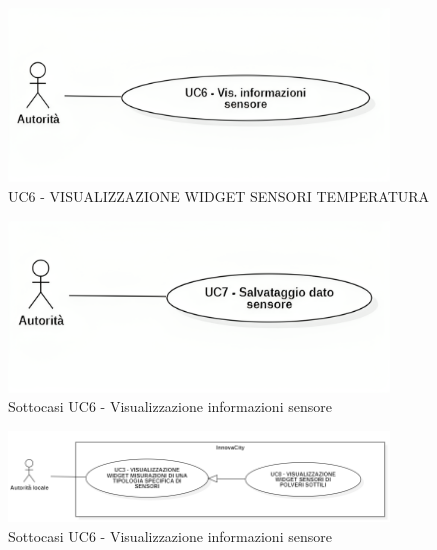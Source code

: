 


\begin{figure}[H]
    \centering
    \includegraphics[width=0.9\textwidth]{../Images/uc6.png}
    \caption{UC6 - VISUALIZZAZIONE WIDGET SENSORI TEMPERATURA}
    \label{fig:UC6}
\end{figure}


\begin{figure}[H]
    \centering
    \includegraphics[width=0.9\textwidth]{../Images/uc7.png}
    \caption{Sottocasi UC6 - Visualizzazione informazioni sensore}
    \label{fig:UC6_sub}
\end{figure}


\begin{figure}[H]
    \centering
    \includegraphics[width=0.9\textwidth]{../Images/uc8.PNG}
    \caption{Sottocasi UC6 - Visualizzazione informazioni sensore}
    \label{fig:UC6_sub}
\end{figure}

